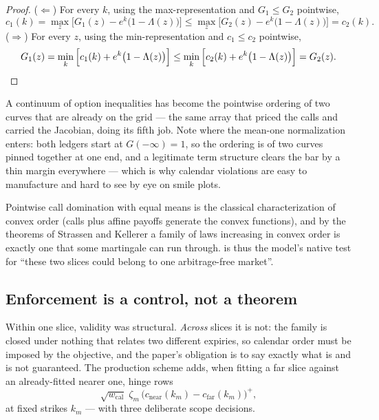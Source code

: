 \begin{proof}
($\Leftarrow$) For every $k$, using the max-representation and
$G_1\le G_2$ pointwise,
\[
c_1(k)=\max_z\Big[G_1(z)-e^{k}\big(1-\Lambda(z)\big)\Big]
\le\max_z\Big[G_2(z)-e^{k}\big(1-\Lambda(z)\big)\Big]=c_2(k) .
\]
($\Rightarrow$) For every $z$, using the min-representation and
$c_1\le c_2$ pointwise,
\[
G_1(z)=\min_k\Big[c_1(k)+e^{k}\big(1-\Lambda(z)\big)\Big]
\le\min_k\Big[c_2(k)+e^{k}\big(1-\Lambda(z)\big)\Big]=G_2(z) .
\qedhere
\]
\end{proof}

A continuum of option inequalities has become the pointwise ordering of
two curves that are already on the grid --- the same array that priced
the calls and carried the Jacobian, doing its fifth job.  Note where the
mean-one normalization enters: both ledgers start at $G(-\infty)=1$, so
the ordering is of two curves pinned together at one end, and a
legitimate term structure clears the bar by a thin margin everywhere ---
which is why calendar violations are easy to manufacture and hard to see
by eye on smile plots.

\begin{remark}
Pointwise call domination with equal means is the classical
characterization of convex order (calls plus affine payoffs generate the
convex functions), and by the theorems of Strassen and Kellerer
\citep{Strassen1965,Kellerer1972} a family of laws increasing in convex
order is exactly one that some martingale can run through.
 is thus the model's native test for ``these two
slices could belong to one arbitrage-free market''.
\end{remark}

\subsection{Enforcement is a control, not a theorem}
\label{sec:calcontrol}

Within one slice, validity was structural.  \emph{Across} slices it is
not: the family is closed under nothing that relates two different
expiries, so calendar order must be imposed by the objective, and the
paper's obligation is to say exactly what is and is not guaranteed.  The
production scheme adds, when fitting a far slice against an
already-fitted nearer one, hinge rows
\begin{equation}
\sqrt{w_{\mathrm{cal}}}\;\zeta_m\,
\big(c_{\mathrm{near}}(k_m)-c_{\mathrm{far}}(k_m)\big)^{+},
\label{eq:calrows}
\end{equation}
at fixed strikes $k_m$ --- with three deliberate scope decisions.

